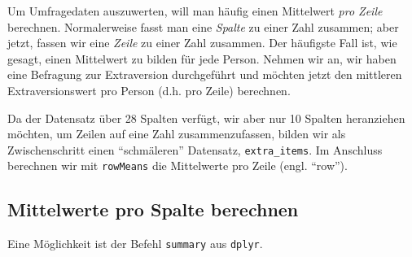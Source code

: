 \documentclass[12pt,ngerman,]{book}
\makeatletter
\newenvironment{Shaded}{\begin{snugshade}}{\end{snugshade}}
\newcommand{\KeywordTok}[1]{\textcolor[rgb]{0.13,0.29,0.53}{\textbf{#1}}}
\newcommand{\StringTok}[1]{\textcolor[rgb]{0.31,0.60,0.02}{#1}}
\newcommand{\CommentTok}[1]{\textcolor[rgb]{0.56,0.35,0.01}{\textit{#1}}}
\newcommand{\OperatorTok}[1]{\textcolor[rgb]{0.81,0.36,0.00}{\textbf{#1}}}
\newcommand{\NormalTok}[1]{#1}
\newenvironment{kframe}{%
\medskip{}
\setlength{\fboxsep}{.8em}
 \def\at@end@of@kframe{}%
 \ifinner\ifhmode%
  \def\at@end@of@kframe{\end{minipage}}%
  \begin{minipage}{\columnwidth}%
 \fi\fi%
 \def\FrameCommand##1{\hskip\@totalleftmargin \hskip-\fboxsep
 \colorbox{shadecolor}{##1}\hskip-\fboxsep
     \hskip-\linewidth \hskip-\@totalleftmargin \hskip\columnwidth}%
 \MakeFramed {\advance\hsize-\width
   \@totalleftmargin\z@ \linewidth\hsize
   \@setminipage}}%
 {\par\unskip\endMakeFramed%
 \at@end@of@kframe}
\renewenvironment{Shaded}{\begin{kframe}}{\end{kframe}}
\theoremstyle{definition}
\theoremstyle{definition}
\theoremstyle{remark}
\makeatother
\begin{document}
Um Umfragedaten auszuwerten, will man häufig einen Mittelwert \emph{pro
Zeile} berechnen. Normalerweise fasst man eine \emph{Spalte} zu einer
Zahl zusammen; aber jetzt, fassen wir eine \emph{Zeile} zu einer Zahl
zusammen. Der häufigste Fall ist, wie gesagt, einen Mittelwert zu bilden
für jede Person. Nehmen wir an, wir haben eine Befragung zur
Extraversion durchgeführt und möchten jetzt den mittleren
Extraversionswert pro Person (d.h. pro Zeile) berechnen.

\begin{Shaded}
\end{Shaded}

Da der Datensatz über 28 Spalten verfügt, wir aber nur 10 Spalten
heranziehen möchten, um Zeilen auf eine Zahl zusammenzufassen, bilden
wir als Zwischenschritt einen ``schmäleren'' Datensatz,
\texttt{extra\_items}. Im Anschluss berechnen wir mit \texttt{rowMeans}
die Mittelwerte pro Zeile (engl. ``row'').

\subsection{Mittelwerte pro Spalte
berechnen}\label{mittelwerte-pro-spalte-berechnen}

Eine Möglichkeit ist der Befehl \texttt{summary} aus \texttt{dplyr}.

\begin{Shaded}
\end{Shaded}
\end{document}

